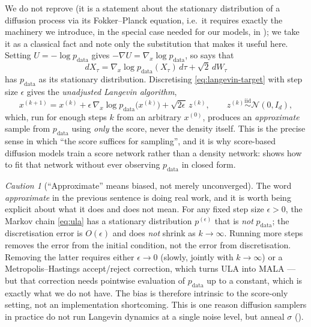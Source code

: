 \documentclass[11pt,a4paper]{report}
\theoremstyle{definition}
\theoremstyle{remark}
\newtheorem{caution}[caution]{Caution}
\begin{document}
We do not reprove  (it is a statement about the
stationary distribution of a diffusion process via its Fokker--Planck
equation, i.e.\ it requires exactly the machinery we introduce, in the
special case needed for our models, in ); we take
it as a classical fact and note only the substitution that makes it useful
here. Setting $U=-\log p_{\mathrm{data}}$ gives $-\nabla U = \nabla_x\log p_{\mathrm{data}}$,
so  says that
\begin{equation}
\label{eq:langevin-target}
dX_\tau = \nabla_x\log p_{\mathrm{data}}(X_\tau)\,d\tau + \sqrt2\,dW_\tau
\end{equation}
has $p_{\mathrm{data}}$ as its stationary distribution. Discretising
\eqref{eq:langevin-target} with step size $\epsilon$ gives the
\emph{unadjusted Langevin algorithm},
\begin{equation}
\label{eq:ula}
x^{(k+1)} = x^{(k)} + \epsilon\,\nabla_x\log p_{\mathrm{data}}\bigl(x^{(k)}\bigr) + \sqrt{2\epsilon}\,z^{(k)},
\qquad z^{(k)}\overset{\mathrm{iid}}\sim\mathcal N(0,I_d),
\end{equation}
which, run for enough steps $k$ from an arbitrary $x^{(0)}$, produces an
\emph{approximate} sample from $p_{\mathrm{data}}$ using \emph{only} the score,
never the density itself. This is the precise sense in which ``the score
suffices for sampling'', and it is why score-based diffusion models train a
score network rather than a density network:
 shows how to fit that network without ever
observing $p_{\mathrm{data}}$ in closed form.

\begin{caution}[``Approximate'' means biased, not merely unconverged]
\label{caution:ula-bias}
The word \emph{approximate} in the previous sentence is doing real work, and
it is worth being explicit about what it does and does not mean. For any
fixed step size $\epsilon>0$, the Markov chain \eqref{eq:ula} has a
stationary distribution $p^{(\epsilon)}$ that is \emph{not} $p_{\mathrm{data}}$;
the discretisation error is $O(\epsilon)$ and does \emph{not} shrink as
$k\to\infty$. Running more steps removes the error from the initial
condition, not the error from discretisation. Removing the latter requires
either $\epsilon\to0$ (slowly, jointly with $k\to\infty$) or a
Metropolis--Hastings accept/reject correction, which turns ULA into MALA ---
but that correction needs pointwise evaluation of $p_{\mathrm{data}}$ up to a
constant, which is exactly what we do not have. The bias is therefore
intrinsic to the score-only setting, not an implementation shortcoming. This
is one reason diffusion samplers in practice do not run Langevin dynamics at
a single noise level, but anneal $\sigma$ ().
\end{caution}
\end{document}
